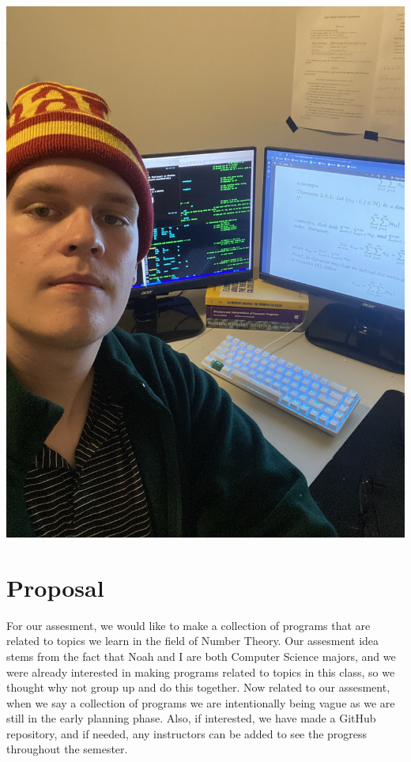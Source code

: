\documentclass[11pt]{article}
\begin{document}
\begin{center}
\includegraphics[scale=0.07]{noah} \\
\end{center}
\newpage
\section*{Proposal}
For our assesment, we would like to make a collection of programs that are related to topics we learn in the field of Number Theory.
Our assesment idea stems from the fact that Noah and I are both Computer Science majors, and we were already interested in making programs related to topics in this class, so we thought why not group up and do this together.
Now related to our assesment, when we say a collection of programs we are intentionally being vague as we are still in the early planning phase.
Also, if interested, we have made a GitHub repository, and if needed, any instructors can be added to see the progress throughout the semester.
\end{document}
